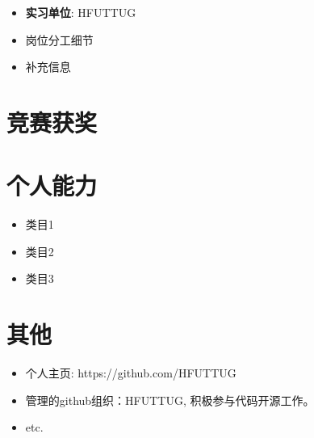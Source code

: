 \documentclass{resume}
\begin{document}
\begin{itemize}[parsep=0.5ex]
    \item \textbf{实习单位}: HFUTTUG
    \item 岗位分工细节
    \item 补充信息
\end{itemize}


\section{竞赛获奖}





\section{个人能力}
\begin{itemize}[parsep=0.5ex]
    \item 类目1
    \item 类目2
    \item 类目3
\end{itemize}

\section{其他}
\begin{itemize}[parsep=0.5ex]
    \item 个人主页: https://github.com/HFUTTUG
    \item 管理的github组织：HFUTTUG, 积极参与代码开源工作。
    \item etc.
\end{itemize}
\end{document}
